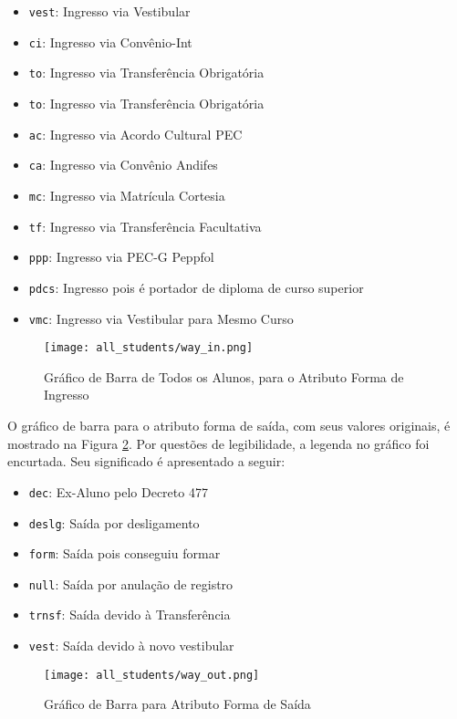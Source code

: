     \begin{itemize}
    \item \texttt{vest}: Ingresso via Vestibular
    \item \texttt{ci}: Ingresso via Convênio-Int
    \item \texttt{to}: Ingresso via Transferência Obrigatória
    \item \texttt{to}: Ingresso via Transferência Obrigatória
    \item \texttt{ac}: Ingresso via Acordo Cultural PEC
    \item \texttt{ca}: Ingresso via Convênio Andifes
    \item \texttt{mc}: Ingresso via Matrícula Cortesia
    \item \texttt{tf}: Ingresso via Transferência Facultativa
    \item \texttt{ppp}: Ingresso via PEC-G Peppfol
    \item \texttt{pdcs}: Ingresso pois é portador de diploma de curso superior
    \item \texttt{vmc}: Ingresso via Vestibular para Mesmo Curso
    \end{itemize}

    \begin{figure}[!ht]
    \caption{Gráfico de Barra de Todos os Alunos, para o Atributo Forma de Ingresso}
    \centering
    \texttt{[image: all\_students/way\_in.png]}
    \label{atr_way_in_org}
    \end{figure}

O gráfico de barra para o atributo forma de saída, com seus valores originais, é
mostrado na Figura \ref{atr_way_out_org}. 
Por questões de legibilidade, a legenda no gráfico foi encurtada. Seu significado é
apresentado a seguir: 

    \begin{itemize}
    \item \texttt{dec}: Ex-Aluno pelo Decreto 477
    \item \texttt{deslg}: Saída por desligamento
    \item \texttt{form}: Saída pois conseguiu formar
    \item \texttt{null}: Saída por anulação de registro
    \item \texttt{trnsf}: Saída devido à Transferência
    \item \texttt{vest}: Saída devido à novo vestibular
    \end{itemize}

    \begin{figure}[!ht]
    \caption{Gráfico de Barra para Atributo Forma de Saída}
    \centering
    \texttt{[image: all\_students/way\_out.png]}
    \label{atr_way_out_org}
    \end{figure}


